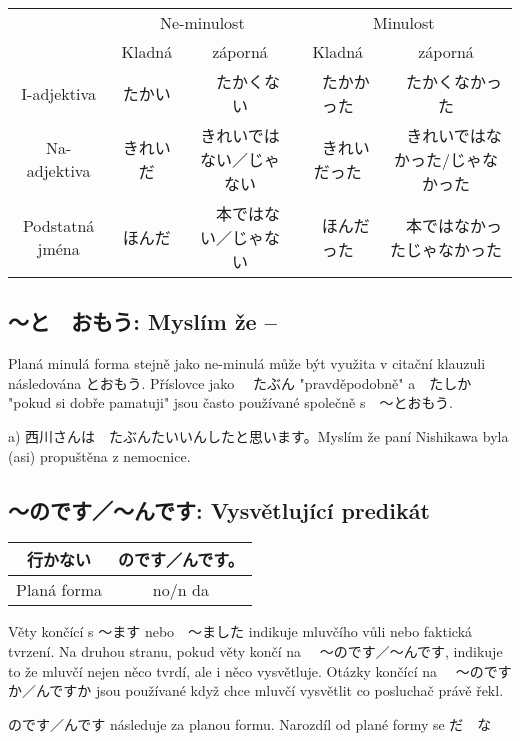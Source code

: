 \begin{center}	
\begin{tabular}{ccccc}
\hline
&\multicolumn{2}{c}{Ne-minulost}&\multicolumn{2}{c}{Minulost}\\
&Kladná&záporná&Kladná & záporná\\
\hline
I-adjektiva &たかい&　たかくない&　たかかった&　たかくなかった\\
\hline
Na-adjektiva &きれいだ　&きれいではない／じゃない&　きれいだった&　きれいではなかった/じゃなかった\\
\hline
Podstatná jména &ほんだ&　本ではない／じゃない&　ほんだった&　本ではなかったじゃなかった\\
\hline
\end{tabular}
\end{center}


\subsection{〜と　おもう:  Myslím že --}

Planá minulá forma stejně jako ne-minulá může být využita v citační klauzuli následována とおもう. Příslovce  jako 　たぶん "pravděpodobně" a　たしか "pokud si dobře pamatuji" jsou často používané společně s　〜とおもう.

a) 西川さんは　たぶんたいいんしたと思います。Myslím že paní Nishikawa byla (asi) propuštěna z nemocnice.


\subsection{〜のです／〜んです: Vysvětlující predikát}
\begin{center}
\begin{tabular}{|c|c|}
\hline
行かない　&のです／んです。\\
\hline
Planá forma & no/n da\\
\end{tabular}
\end{center}


Věty končící s 〜ます nebo　〜ました indikuje mluvčího vůli nebo faktická tvrzení. Na druhou stranu, pokud věty končí na 　〜のです／〜んです, indikuje to že mluvčí nejen něco tvrdí, ale i něco vysvětluje. Otázky končící na 　〜のですか／んですか jsou používané když chce mluvčí vysvětlit co posluchač právě řekl.


のです／んです následuje za planou formu. Narozdíl od plané formy se だ　な

